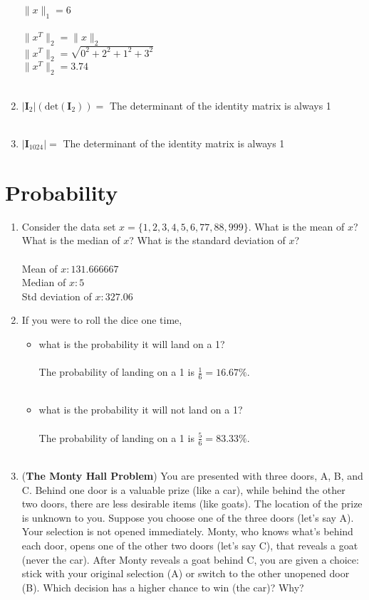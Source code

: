 \documentclass{assignment}
\begin{document}
\begin{problem}
\begin{enumerate}
    $\lVert x \rVert_{1} = 6$\\\\
    $\lVert x^T \rVert_{2} = \lVert x \rVert_2 $\\
    $\lVert x^T \rVert_{2} = \sqrt{0^2 + 2^2 + 1^2 + 3^2}$\\
    $\lVert x^T \rVert_{2} = 3.74$\\\\
    \item $\lvert \mathbf{I}_{2}\rvert (\text{det}(\mathbf{I}_2)) =$ The determinant of the identity matrix is always 1 \\\\
    \item $\lvert \mathbf{I}_{1024}\rvert = $ The determinant of the identity matrix is always 1 
\end{enumerate}
\newpage
\section{Probability}

\begin{enumerate}
    \item Consider the data set $x = \{1, 2, 3, 4, 5, 6, 77, 88, 999\}$. What is the mean of $x$? What is the median of $x$? What is the standard deviation of $x$?\\\\
    Mean of $x: 131.666667$\\
    Median of $x: 5$\\
    Std deviation of $x: 327.06$
    \item If you were to roll the dice one time, 
    \begin{itemize}
        \item what is the probability it will land on a 1?\\\\
        The probability of landing on a 1 is $\frac{1}{6} = 16.67\%$.\\\\
        \item what is the probability it will not land on a 1?\\\\
        The probability of landing on a 1 is $\frac{5}{6} = 83.33\%$.\\\\
    \end{itemize}
    \item (\textbf{The Monty Hall Problem}) You are presented with three doors, A, B, and C. Behind one door is a valuable prize (like a car), while behind the other two doors, there are less desirable items (like goats). The location of the prize is unknown to you. Suppose you choose one of the three doors (let's say A). Your selection is not opened immediately. Monty, who knows what's behind each door, opens one of the other two doors (let's say C), that reveals a goat (never the car). After Monty reveals a goat behind C, you are given a choice: stick with your original selection (A) or switch to the other unopened door (B). Which decision has a higher chance to win (the car)? Why?\\


\end{enumerate}
\end{problem}
\end{document}
